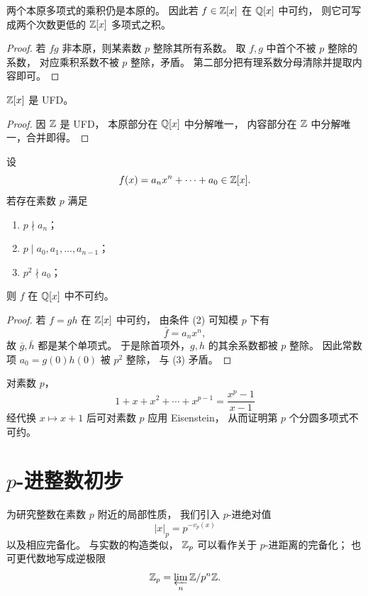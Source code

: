 \begin{lemma}[Gauss 引理]
两个本原多项式的乘积仍是本原的。
因此若 $f\in\mathbb{Z}[x]$ 在 $\mathbb{Q}[x]$ 中可约，
则它可写成两个次数更低的 $\mathbb{Z}[x]$ 多项式之积。
\end{lemma}

\begin{proof}
若 $fg$ 非本原，则某素数 $p$ 整除其所有系数。
取 $f,g$ 中首个不被 $p$ 整除的系数，
对应乘积系数不被 $p$ 整除，矛盾。
第二部分把有理系数分母清除并提取内容即可。
\end{proof}

\begin{corollary}
$\mathbb{Z}[x]$ 是 UFD。
\end{corollary}

\begin{proof}
因 $\mathbb{Z}$ 是 UFD，
本原部分在 $\mathbb{Q}[x]$ 中分解唯一，
内容部分在 $\mathbb{Z}$ 中分解唯一，合并即得。
\end{proof}

\begin{theorem}
设
\[
f(x)=a_nx^n+\cdots+a_0\in \mathbb{Z}[x].
\]
若存在素数 $p$ 满足
\begin{enumerate}[label=(\arabic*)]
\item $p\nmid a_n$；
\item $p\mid a_0,a_1,\dots,a_{n-1}$；
\item $p^2\nmid a_0$；
\end{enumerate}
则 $f$ 在 $\mathbb{Q}[x]$ 中不可约。
\end{theorem}

\begin{proof}
若 $f=gh$ 在 $\mathbb{Z}[x]$ 中可约，
由条件 (2) 可知模 $p$ 下有
\[
\bar f=a_nx^n,
\]
故 $\bar g,\bar h$ 都是某个单项式。
于是除首项外，$g,h$ 的其余系数都被 $p$ 整除。
因此常数项 $a_0=g(0)h(0)$ 被 $p^2$ 整除，
与 (3) 矛盾。
\end{proof}

\begin{example}
对素数 $p$，
\[
1+x+x^2+\cdots+x^{p-1}=\frac{x^p-1}{x-1}
\]
经代换 $x\mapsto x+1$ 后可对素数 $p$ 应用 Eisenstein，
从而证明第 $p$ 个分圆多项式不可约。
\end{example}

\section{$p$-进整数初步}

为研究整数在素数 $p$ 附近的局部性质，
我们引入 $p$-进绝对值
\[
|x|_p=p^{-v_p(x)}
\]
以及相应完备化。
与实数的构造类似，
$\mathbb{Z}_p$ 可以看作关于 $p$-进距离的完备化；
也可更代数地写成逆极限
\[
\mathbb{Z}_p=\varprojlim_n \mathbb{Z}/p^n\mathbb{Z}.
\]

